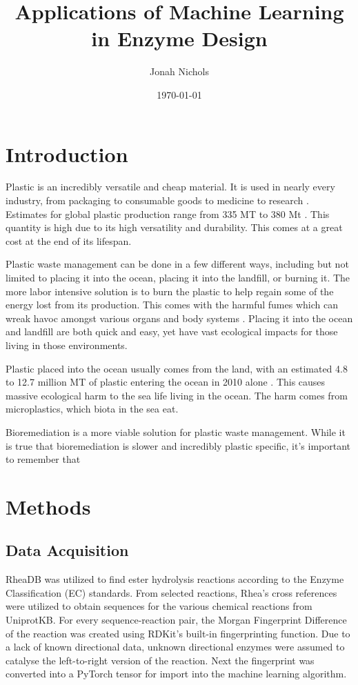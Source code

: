\documentclass[12pt]{article}
\title{Applications of Machine Learning in Enzyme Design}
\author{Jonah Nichols}
\date{\today}
\begin{document}
\maketitle
\section{Introduction}
Plastic is an incredibly versatile and cheap material. It is used in nearly every industry,
from packaging to consumable goods to medicine to research \cite{geyer2017production}.
Estimates for global plastic production range from 335 MT to 380 Mt \cite{drzyzga2019plastic,
geyer2017production,leal2019overview}. This quantity is high due to its high versatility
and durability. This comes at a great cost at the end of its lifespan.

Plastic waste management can be done in a few different ways, including but not
limited to placing it into the ocean, placing it into the landfill, or burning it.
The more labor intensive solution is to burn the plastic to help regain some of
the energy lost from its production. This comes with the harmful fumes which can
wreak havoc amongst various organs and body systems \cite{agnes2016environmental}.
Placing it into the ocean and landfill are both quick and easy, yet have vast ecological
impacts for those living in those environments.


Plastic placed into the ocean usually comes from the land, with an estimated 4.8
to 12.7 million MT of plastic entering the ocean in 2010 alone \cite{jambeck2015plastic}.
This causes massive ecological harm to the sea life living in the ocean. The harm
comes from microplastics, which biota in the sea eat. 

Bioremediation is a more viable solution for plastic waste management. While it
is true that bioremediation is slower and incredibly plastic specific, it's important
to remember that 

\section{Methods}
\subsection{Data Acquisition}
RheaDB was utilized to find ester hydrolysis reactions according to the Enzyme Classification
(EC) standards. From selected reactions, Rhea's cross references were utilized
to obtain sequences for the various chemical reactions from UniprotKB. For every
sequence-reaction pair, the Morgan Fingerprint Difference of the reaction was created using
RDKit's built-in fingerprinting function. Due to a lack of known directional data,
unknown directional enzymes were assumed to catalyse the left-to-right version of
the reaction. Next the fingerprint was converted into a PyTorch tensor for import
into the machine learning algorithm.
\end{document}
